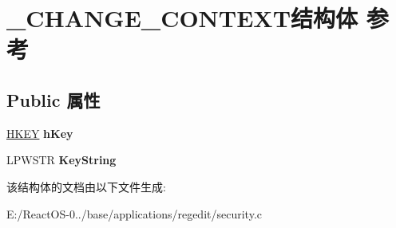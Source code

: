 \hypertarget{struct___c_h_a_n_g_e___c_o_n_t_e_x_t}{}\section{\+\_\+\+C\+H\+A\+N\+G\+E\+\_\+\+C\+O\+N\+T\+E\+X\+T结构体 参考}
\label{struct___c_h_a_n_g_e___c_o_n_t_e_x_t}
\subsection*{Public 属性}
\begin{DoxyCompactItemize}
\item 
\mbox{\label{struct___c_h_a_n_g_e___c_o_n_t_e_x_t_a37cb4b24c66af2d86acfec9c2e67ba5d}} 
\hyperlink{interfacevoid}{H\+K\+EY} {\bfseries h\+Key}
\item 
\mbox{\label{struct___c_h_a_n_g_e___c_o_n_t_e_x_t_aa0ac60206bb423e1f724cad21a07f369}} 
L\+P\+W\+S\+TR {\bfseries Key\+String}
\end{DoxyCompactItemize}


该结构体的文档由以下文件生成\+:\begin{DoxyCompactItemize}
\item 
E\+:/\+React\+O\+S-\/0../base/applications/regedit/security.\+c\end{DoxyCompactItemize}
